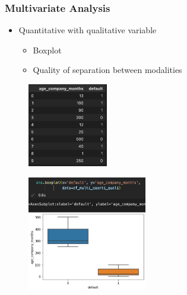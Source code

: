 \begin{frame}\frametitle{Multivariate Analysis}
   \begin{minipage}{0.48\linewidth}
      \begin{itemize}
         \item Quantitative with qualitative variable
         \begin{itemize}
            \item Boxplot
            \item Quality of separation between modalities
         \end{itemize}
      \end{itemize}
      \vspace{.5cm}
      \begin{figure}[H]
         \includegraphics[width=3.5cm]{../images/illustrations/pattern_multivariate_quanti_quali_df.png}
      \end{figure}
   \end{minipage}
   \begin{minipage}{0.48\linewidth}
      \begin{figure}[H]
         \includegraphics[width=5.2cm]{../images/illustrations/pattern_multivariate_quanti_quali_boxplot.png}
      \end{figure}
   \end{minipage}
\end{frame}

